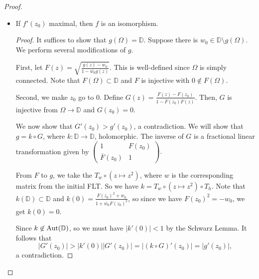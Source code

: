 \documentclass[12pt]{scrartcl}
\let \ol \overline
\begin{document}
\begin{proof}
\begin{itemize}
\begin{proof}
We still need to show $g$ is injective.  Let $z_1 \ne z_2$, $z_1, z_2 \in \Omega$, $g(z_1)= g(z_2)$.  Then in $\Omega\setminus \{z_1\}$, $g_n(\cdot) - g_n(z_1) \ne 0$ for all points in $\Omega \setminus \{z_1\}$.  By the Hurwitz theorem, $g(\cdot) - g(z_1)$ is either $0$ or never vanishes.   But $g(\cdot)$ is not a constant function since $g'(z_0) > 0$, so we have $g(\cdot) - g(z_1)$ never vanishes on $\Omega \setminus \{z_1\}$, so $g(z_2) \ne g(z_1)$, a contradiction.  

Moreoever, $\|g\|_\Omega \le 1$ gives that $g(\Omega) \subset \ol{\mathbb D}$, but by the maximum principle, we have $g(\Omega) \subset \mathbb D$.

\end{proof}
\item If $f'(z_0)$ maximal, then $f$ is an isomorphism.
\begin{proof}
It suffices to show that $g(\Omega) = \mathbb D$.  Suppose there is $w_0 \in \mathbb D \setminus g(\Omega)$.  We perform several modifications of $g$.  

First, let $F(z) = \sqrt{\frac{g(z) - w_0}{1 - \ol{w_0} g(z)}}.$  This is well-defined since $\Omega$ is simply connected.   Note that $F(\Omega) \subset \mathbb D$ and $F$ is injective with $0 \not \in F(\Omega)$.  

Second, we make $z_0$ go to $0$.  Define $G(z) = \frac{F(z) - F(z_0)}{1 - \ol{F}(z_0)F(z)}$.  Then, $G$ is injective from $\Omega \to \mathbb D$ and $G(z_0) = 0$.

We now show that $G'(z_0) > g'(z_0)$, a contradiction.  We will show that $g = k \circ G$, where $k: \mathbb D \to \mathbb D$, holomorphic.  The inverse of $G$ is a fractional linear transformation given by $ \begin{pmatrix}
1 & F(z_0) \\ \ol{F}(z_0) & 1 
\end{pmatrix}.$

From $F$ to $g$, we take the $T_w \circ(z \mapsto z^2)$, where $w$ is the corresponding matrix from the initial FLT.    So we have $k = T_w \circ (z \mapsto z^2) \circ T_h$.  Note that $k(\mathbb D) \subset \mathbb D$ and $k(0) = \frac{F(z_0)^2 + w_0}{1 + \ol{w_0}F(z_0)^2}$, so since we have $F(z_0)^2 = -w_0$, we get $k(0) = 0$.  

Since $k \not \in \operatorname{Aut}(\mathbb D)$, so we must have $|k'(0)| < 1$ by the Schwarz Lemma.  It follows that 
$$|G'(z_0)|  > |k'(0)||G'(z_0)| = |(k \circ G)'(z_0)| = |g'(z_0)|,$$
a contradiction.
\end{proof}
\end{itemize}
\end{proof}
\end{document}
